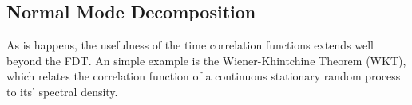\subsection{Normal Mode Decomposition}
As is happens, the usefulness of the time correlation functions extends well beyond the FDT. An simple example is the Wiener-Khintchine Theorem (WKT), which relates the correlation function of a continuous stationary random process to its' spectral density. 

\begin{comment}
The correlation function of a time-dependent quantity (i.e: position, velocity, etc.) is defined as the average behaviour in time of said quantity \cite{mcquarrie}
%
\begin{equation}
C(t)=\lim_{T->\infty}\frac{1}{2T}\int_{-T}^{T}x(t+t')x(t')dt'
\end{equation}
%
From the ergodic hypothesis, as used in the Section ~\ref{}%
\begin{equation}
C(t)=<x(t+t')x(t')>.
\end{equation}
%
Let's define $X(\omega)$ as the Fourier Transform of $x(t)$
%
\begin{equation}
X(\omega)=\int_{-\infty}^{\infty}x(t)e^{-i\omega t}dt.
\end{equation}
%
\end{comment}

